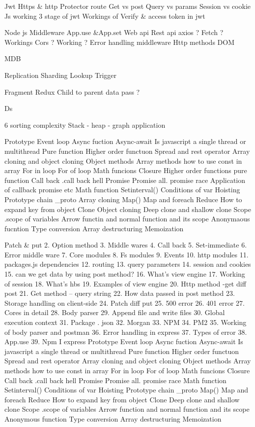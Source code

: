 
Jwt 
Https & http
Protector route
Get vs post
Query vs params
Session vs cookie
Js working
3 stage of jwt
Workings of Verify & access token in jwt 


Node js
Middleware
App.use &App.set
Web api
Rest api
axios ? Fetch ? Workings
Cors ? Working ?
Error handling middleware
Http methods
DOM 

MDB

Replication
Sharding
Lookup
Trigger



Fragment
Redux
Child to parent data pass ?


Ds 

6 sorting complexity 
Stack - heap - graph application

Prototype
Event loop
Async fuction
Async-await
Is javascript a single thread or multithread
Pure function
Higher order functuon
Spread and rest operator
Array cloning  and object cloning
Object methods
Array methods
 how to use const in array
For in loop
For of loop
Math funcions
Closure
Higher order functions pure function
Call back
.call back hell
Promise
Promise all.
promise race
Application of callback promise etc
Math function
Setinterval()
Conditions of var
Hoisting
Prototype chain
_proto
Array cloning
Map()
Map and foreach
Reduce
How to expand key from object
Clone
Object cloning
Deep clone and shallow clone
Scope
.scope of variables
Arrow functin and normal function and its scope
Anonymaous fucntion
Type conversion
Array destructuring
Memoization

Patch & put 
2.	Option method 
3.	Middle wares
4.	Call back
5.	 Set-immediate
6.	Error middle ware 
7.	Core modules 
8.	Fs modules 
9.	Events
10.	http modules
11.	packages.js dependencies
12.	routing
13.	query parameters
14.	session and cookies
15.	can we get data by using post method?
16.	What’s view engine
17.	Working of session
18.	What’s hbs
19.	Examples of view engine
20.	Http method -get diff post 
21.	Get method – query string
22.	How data passed in post method
23.	Storage handling on client-side
24.	Patch diff put 
25.	500 error
26.	401 error
27.	Cores in detail
28.	Body parser
29.	Append file and write files
30.	Global execution context
31.	Package . json
32.	Morgan
33.	NPM 
34.	PM2 
35.	Working of body parser and postman
36.	Error handling in express
37.	Types of error 
38.	App.use
39.	Npm I express
Prototype
Event loop
Async fuction
Async-await
Is javascript a single thread or multithread
Pure function
Higher order functuon
Spread and rest operator
Array cloning  and object cloning
Object methods
Array methods
 how to use const in array
For in loop
For of loop
Math funcions
Closure
Call back
.call back hell
Promise
Promise all.
promise race
Math function
Setinterval()
Conditions of var
Hoisting
Prototype chain
_proto
Map()
Map and foreach
Reduce
How to expand key from object
Clone
Deep clone and shallow clone
Scope
.scope of variables
Arrow function and normal function and its scope
Anonymous function 
Type conversion
Array destructuring
Memoization

